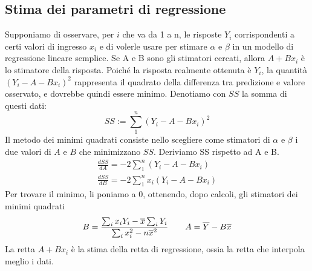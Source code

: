 \documentclass[11pt]{article}
\begin{document}
\subsection{Stima dei parametri di regressione}
Supponiamo di osservare, per $i$ che va da 1 a n, le risposte $Y_i$ corrispondenti a certi valori di ingresso $x_i$ e di volerle usare per stimare $\alpha$ e $\beta$ in un modello di regressione lineare semplice. Se A e B sono gli stimatori cercati, allora $A+Bx_i$ è lo stimatore della risposta. Poiché la risposta realmente ottenuta è $Y_i$, la quantità $(Y_i-A-Bx_i)^2$ rappresenta il quadrato della differenza tra predizione e valore osservato, e dovrebbe quindi essere minimo. Denotiamo con $SS$ la somma di questi dati:
\begin{displaymath}
    SS:=\sum_1^n (Y_i-A-Bx_i)^2
\end{displaymath}
Il metodo dei minimi quadrati consiste nello scegliere come stimatori di $\alpha$ e $\beta$ i due valori di $A$ e $B$ che minimizzano $SS$. Deriviamo SS rispetto ad A e B.
\begin{gather*}
    \frac{dSS}{dA} = -2 \sum_1^n (Y_i-A-Bx_i)\\ 
    \frac{dSS}{dB} = -2 \sum_1^n x_i(Y_i-A-Bx_i)
\end{gather*}
Per trovare il minimo, li poniamo a 0, ottenendo, dopo calcoli, gli stimatori dei minimi quadrati
\begin{displaymath}
    B=\frac{\sum_i x_iY_i-\overline{x}\sum_i Y_i}{\sum_i x_i^2-n\overline{x}^2}\hspace{20px}A=\overline{Y} - B\overline{x}
\end{displaymath}
La retta $A+Bx_i$ è la stima della retta di regressione, ossia la retta che interpola meglio i dati.
\end{document}
